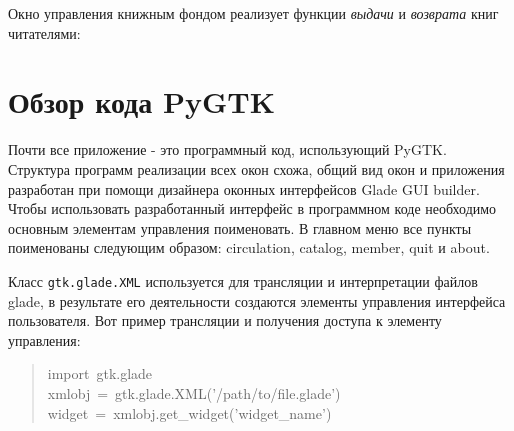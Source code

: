 \documentclass[a4paper,openany,twoside,final]{book}
\begin{document}
\noindent{}

Окно управления книжным фондом реализует функции \emph{выдачи} и \emph{возврата}
книг читателями:

\noindent{}


\section{Обзор кода PyGTK%
  \label{pygtk}%
}

Почти все приложение - это программный код, использующий PyGTK.
Структура программ реализации всех окон схожа, общий вид окон и
приложения разработан при помощи дизайнера оконных интерфейсов Glade
GUI builder.  Чтобы использовать разработанный интерфейс в программном
коде необходимо основным элементам управления поименовать.  В главном
меню все пункты поименованы следующим образом: \textquotedbl{}circulation\textquotedbl{},
\textquotedbl{}catalog\textquotedbl{}, \textquotedbl{}member\textquotedbl{}, \textquotedbl{}quit\textquotedbl{} и \textquotedbl{}about\textquotedbl{}.

Класс \texttt{gtk.glade.XML} используется для трансляции и интерпретации
файлов glade, в результате его деятельности создаются элементы
управления интерфейса пользователя.  Вот пример трансляции и получения
доступа к элементу управления:

\begin{quote}{\ttfamily \raggedright \noindent
import~gtk.glade\\
xmlobj~=~gtk.glade.XML('/path/to/file.glade')\\
widget~=~xmlobj.get\_widget('widget\_name')
}
\end{quote}
\end{document}
